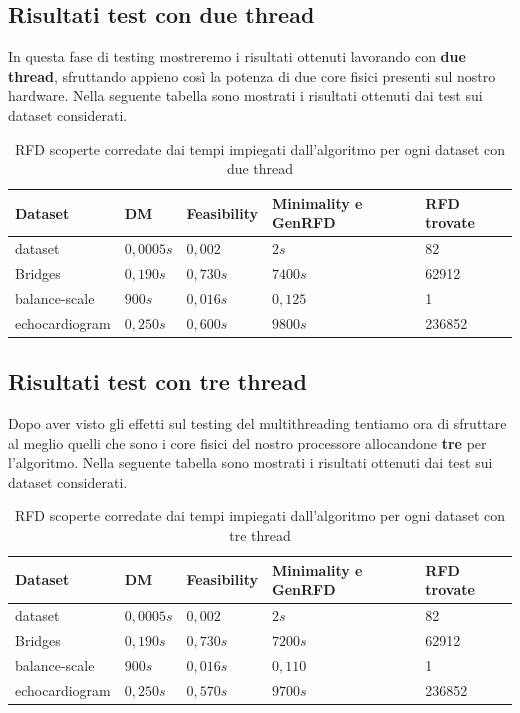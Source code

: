 \subsection{Risultati test con due thread}
In questa fase di testing mostreremo i risultati ottenuti lavorando con \textbf{due thread}, sfruttando appieno così la potenza di due core fisici presenti sul nostro hardware.
Nella seguente tabella sono mostrati i risultati ottenuti dai test sui dataset considerati.
\begin{table}[H]
	\centering
	\begin{tabular}{lllll}
		Dataset & DM & Feasibility & Minimality e GenRFD & RFD trovate \\
		\hline
		dataset& $0,0005s$ & $0,002$ & $2s$ & 82 \\
		Bridges & $0,190s$  & $0,730s$ & $7400s$ & 62912 \\
		balance-scale  & $900s$  & $0,016s$ & $0,125$ & 1\\
		echocardiogram  & $0,250s$  & $0,600s$ & $9800s$ & 236852\\
		\hline
	\end{tabular}
	\label{risultati_2_thread}
	\caption{RFD scoperte corredate dai tempi impiegati dall'algoritmo per ogni dataset con due thread}
\end{table}
\subsection{Risultati test con tre thread}
Dopo aver visto gli effetti sul testing del multithreading tentiamo ora di sfruttare al meglio quelli che sono i core fisici del nostro processore allocandone \textbf{tre} per l'algoritmo.
Nella seguente tabella sono mostrati i risultati ottenuti dai test sui dataset considerati.
\begin{table}[H]
	\centering
	\begin{tabular}{lllll}
		Dataset & DM & Feasibility & Minimality e GenRFD & RFD trovate \\
		\hline
		dataset& $0,0005s$ & $0,002$ & $2s$ & 82 \\
		Bridges & $0,190s$  & $0,730s$ & $7200s$ & 62912 \\
		balance-scale  & $900s$  & $0,016s$ & $0,110$ & 1\\
		echocardiogram  & $0,250s$  & $0,570s$ & $9700s$ & 236852\\
		\hline
	\end{tabular}
	\label{risultati_3_thread}
	\caption{RFD scoperte corredate dai tempi impiegati dall'algoritmo per ogni dataset con tre thread}
\end{table}
